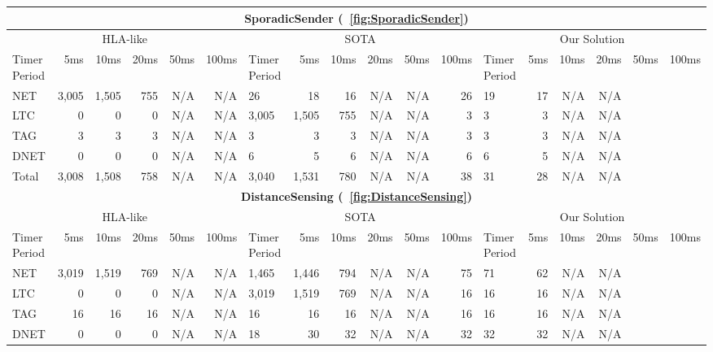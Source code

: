 \begin{table*}
\scriptsize
	\centering
	\begin{tabular}{|l|rrrrr||l|rrrrr||l|rrrrr|}
		\hline
		\multicolumn{18}{|c|}{\textbf{SporadicSender (\figurename~\ref{fig:SporadicSender})}} \\
		\hline
		\multicolumn{6}{|c||}{HLA-like} & \multicolumn{6}{|c||}{SOTA} & \multicolumn{6}{|c|}{Our Solution} \\
		\hline
		Timer Period \hspace{-5pt} & 5ms & 10ms & 20ms & 50ms & 100ms & Timer Period \hspace{-5pt} & 5ms & 10ms & 20ms & 50ms & 100ms & Timer Period \hspace{-5pt} & 5ms & 10ms & 20ms & 50ms & 100ms \\
		\hline
		NET & 3,005 & 1,505 & 755 & N/A & N/A & 26 & 18 & 16 & N/A & N/A & 26 & 19 & 17 & N/A & N/A \\
		LTC & 0 & 0 & 0 & N/A & N/A & 3,005 & 1,505 & 755 & N/A & N/A & 3 & 3 & 3 & N/A & N/A \\
		TAG & 3 & 3 & 3 & N/A & N/A & 3 & 3 & 3 & N/A & N/A & 3 & 3 & 3 & N/A & N/A \\
		DNET & 0 & 0 & 0 & N/A & N/A & 6 & 5 & 6 & N/A & N/A & 6 & 6 & 5 & N/A & N/A \\
		Total & 3,008 & 1,508 & 758 & N/A & N/A & 3,040 & 1,531 & 780 & N/A & N/A & 38 & 31 & 28 & N/A & N/A \\
		\hline
%
		\hline
		\hline
		\multicolumn{18}{|c|}{\textbf{DistanceSensing (\figurename~\ref{fig:DistanceSensing})}} \\
		\hline
		\multicolumn{6}{|c||}{HLA-like} & \multicolumn{6}{|c||}{SOTA} & \multicolumn{6}{|c|}{Our Solution} \\
		\hline
		Timer Period \hspace{-5pt} & 5ms & 10ms & 20ms & 50ms & 100ms & Timer Period \hspace{-5pt} & 5ms & 10ms & 20ms & 50ms & 100ms & Timer Period \hspace{-5pt} & 5ms & 10ms & 20ms & 50ms & 100ms \\
		\hline
		NET & 3,019 & 1,519 & 769 & N/A & N/A & 1,465 & 1,446 & 794 & N/A & N/A & 75 & 71 & 62 & N/A & N/A \\
		LTC & 0 & 0 & 0 & N/A & N/A & 3,019 & 1,519 & 769 & N/A & N/A & 16 & 16 & 16 & N/A & N/A \\
		TAG & 16 & 16 & 16 & N/A & N/A & 16 & 16 & 16 & N/A & N/A & 16 & 16 & 16 & N/A & N/A \\
		DNET & 0 & 0 & 0 & N/A & N/A & 18 & 30 & 32 & N/A & N/A & 32 & 32 & 32 & N/A & N/A \\

\end{tabular}
\end{table*}
